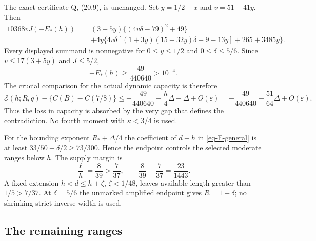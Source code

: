 \documentclass[11pt,a4paper]{article}
\theoremstyle{remark}\newtheorem{remark}[theorem]{Remark}
\newcommand{\eps}{\varepsilon}
\numberwithin{equation}{section}
\begin{document}
The exact certificate Q, (20.9), is unchanged. Set
$y=1/2-x$ and $v=51+41y$. Then
\begin{align}\label{eq-certificate}
 10368vJ(-E_*(h))={}&
 (3+5y)\{(4v\delta-79)^2+49\}\nonumber\\
 &+4y\{4v\delta[(1+3y)(15+32y)\delta+9-13y]
                                      +265+3485y\}.
\end{align}
Every displayed summand is nonnegative for
$0\le y\le1/2$ and $0\le\delta\le5/6$.
Since $v\le17(3+5y)$ and $J\le5/2$,
\begin{equation}\label{eq-high-margin}
 -E_*(h)\ge\frac{49}{440640}>10^{-4}.
\end{equation}
The crucial comparison for the actual dynamic capacity is therefore
\begin{equation}\label{eq-dynamic-saving}
 \mathcal E(h;R,q)-\{C(B)-C(7/8)\}
 \le-\frac{49}{440640}
       +\frac h4\Delta-\Delta+O(\eps)
 =-\frac{49}{440640}-\frac{51}{64}\Delta+O(\eps).
\end{equation}
Thus the loss in capacity is absorbed by the very gap that defines
the contradiction. No fourth moment with $\kappa<3/4$ is used.

For the bounding exponent $R_*+\Delta/4$ the coefficient of
$d-h$ in \eqref{eq-E-general} is at least
$33/50-\delta/2\ge73/300$. Hence the endpoint controls the
selected moderate ranges below $h$. The supply margin is
\[
 \frac{\ell}{h}=\frac8{39}>\frac7{37},\qquad
 \frac8{39}-\frac7{37}=\frac{23}{1443}.
\]
A fixed extension $h<d\le h+\zeta$, $\zeta<1/48$, leaves
available length greater than $1/5>7/37$.
At $\delta=5/6$ the unmarked amplified endpoint gives
$R=1-\delta$; no shrinking strict inverse width is used.

\subsection{The remaining ranges}
\end{document}

